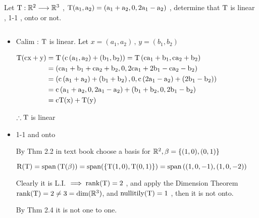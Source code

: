 \begin{example}
	Let $\rm T : \mathbb{R}^2\longrightarrow \mathbb{R}^3 $ , $\rm T(a_1,a_2) = (a_1+a_2 , 0 , 2a_1-a_2)$ , determine that $\rm T $ is linear , 1-1 , onto or not.
	\begin{sol*}
		 $ $
		\begin{itemize}
			\item Calim : $\rm T$ is linear.\newline
			Let $ x =(a_1,a_2) \,,\, y= (b_1,b_2)$ 
				
				\(\begin{aligned} \rm T(c x+y) &=\rm T\left(c\left(a_{1}, a_{2}\right)+\left(b_{1}, b_{2}\right)\right)= T\left(ca_{1}+b_{1}, ca_{2}+b_{2}\right) \\ &=\rm \left(c a_{1}+b_{1}+c a_{2}+b_{2}, 0,2 c a_{1}+2 b_{1}-ca_{2}-b_{2}\right) \\ &=\rm \left(c\left(a_{1}+a_{2}\right)+\left(b_{1}+b_{2}\right), 0, c\left(2 a_{1}-a_{2}\right)+\left(2 b_{1}-b_{2}\right)\right) \\ &=\rm c\left(a_{1}+a_{2}, 0,2 a_{1}-a_{2}\right)+\left(b_{1}+b_{2}, 0,2 b_{1}-b_{2}\right) \\ &=\rm c T(x)+T (y) \end{aligned}\)
				
			$\therefore \rm T $ is linear
			\item 1-1 and onto 	
			
			By Thm 2.2 in text book choose a basis for $\mathbb{R}^2 , \beta = \{(1,0) , (0,1)\}$
			
			$\rm R(T) = span\left(T(\beta)\right) = span(\left\{T(1,0) , T(0,1)\right\}) = span\left((1,0,-1), (1,0,-2)\right)$ 
			
			Clearly it is L.I. $\rm\implies rank(T) = 2$ , and apply the Dimension Theorem $\rm rank(T)=2\neq3=\dim(\mathbb{R}^3) $, and $\rm nullitily(T) = 1 $ , then it is not onto.
			
			By Thm 2.4  it is not one to one.
			
		\end{itemize}
	\end{sol*}
		\end{example}
